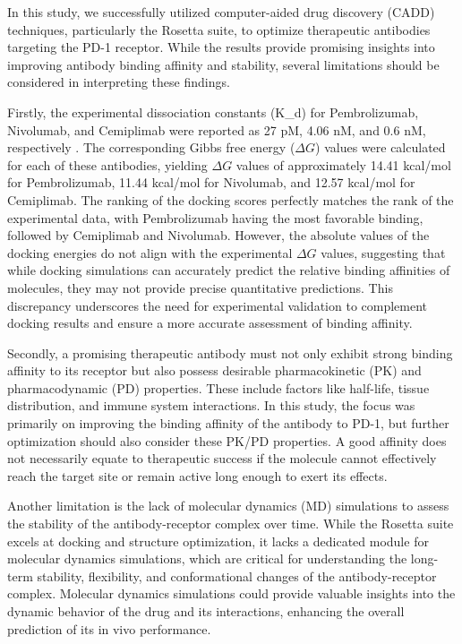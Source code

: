 \documentclass[11pt]{article}
\begin{document}
In this study, we successfully utilized computer-aided drug discovery (CADD) techniques, particularly the Rosetta suite, to optimize therapeutic antibodies targeting the PD-1 receptor. While the results provide promising insights into improving antibody binding affinity and stability, several limitations should be considered in interpreting these findings.

Firstly, the experimental dissociation constants (K\_d) for Pembrolizumab, Nivolumab, and Cemiplimab were reported as 27 pM, 4.06 nM, and 0.6 nM, respectively \cite{jeong2022}. The corresponding Gibbs free energy ($\Delta G$) values were calculated for each of these antibodies, yielding $\Delta G$ values of approximately 14.41 kcal/mol for Pembrolizumab, 11.44 kcal/mol for Nivolumab, and 12.57 kcal/mol for Cemiplimab. The ranking of the docking scores perfectly matches the rank of the experimental data, with Pembrolizumab having the most favorable binding, followed by Cemiplimab and Nivolumab. However, the absolute values of the docking energies do not align with the experimental $\Delta G$ values, suggesting that while docking simulations can accurately predict the relative binding affinities of molecules, they may not provide precise quantitative predictions. This discrepancy underscores the need for experimental validation to complement docking results and ensure a more accurate assessment of binding affinity.

Secondly, a promising therapeutic antibody must not only exhibit strong binding affinity to its receptor but also possess desirable pharmacokinetic (PK) and pharmacodynamic (PD) properties. These include factors like half-life, tissue distribution, and immune system interactions. In this study, the focus was primarily on improving the binding affinity of the antibody to PD-1, but further optimization should also consider these PK/PD properties. A good affinity does not necessarily equate to therapeutic success if the molecule cannot effectively reach the target site or remain active long enough to exert its effects.

Another limitation is the lack of molecular dynamics (MD) simulations to assess the stability of the antibody-receptor complex over time. While the Rosetta suite excels at docking and structure optimization, it lacks a dedicated module for molecular dynamics simulations, which are critical for understanding the long-term stability, flexibility, and conformational changes of the antibody-receptor complex. Molecular dynamics simulations could provide valuable insights into the dynamic behavior of the drug and its interactions, enhancing the overall prediction of its in vivo performance.
\end{document}
